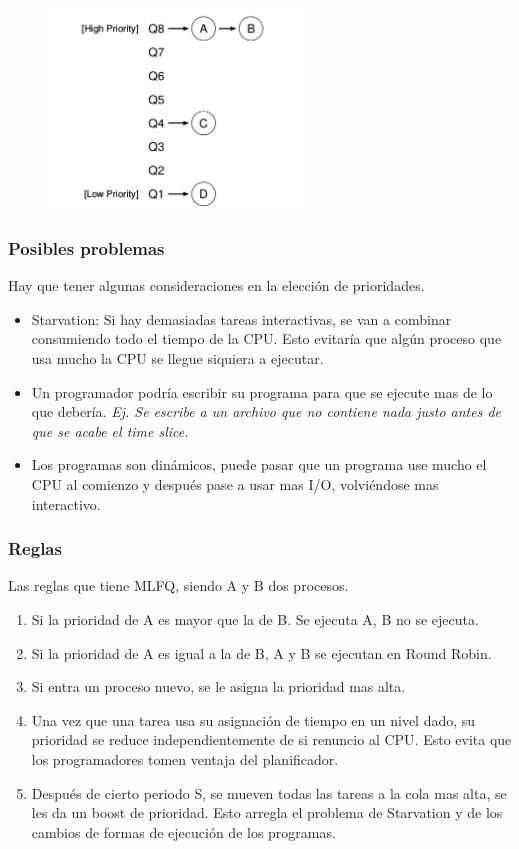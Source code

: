 \documentclass[titlepage,a4paper]{article}
\begin{document}
\begin{figure}[!htb]
    \centering
    \includegraphics[width=0.6\textwidth]{ImagenesApunte/mlfq.jpg}
\end{figure}

\subsubsection*{Posibles problemas}
Hay que tener algunas consideraciones en la elección de prioridades.
\begin{itemize}
    \item Starvation: Si hay demasiadas tareas interactivas, se van a combinar consumiendo todo el tiempo de la CPU. Esto evitaría que algún proceso que usa mucho la CPU se llegue siquiera a ejecutar.
    \item Un programador podría escribir su programa para que se ejecute mas de lo que debería. \textit{Ej. Se escribe a un archivo que no contiene nada justo antes de que se acabe el time slice.}
    \item Los programas son dinámicos, puede pasar que un programa use mucho el CPU al comienzo y después pase a usar mas I/O, volviéndose mas interactivo.
\end{itemize}

\subsubsection*{Reglas}

Las reglas que tiene MLFQ, siendo A y B dos procesos.
\begin{enumerate}
    \item Si la prioridad de A es mayor que la de B. Se ejecuta A, B no se ejecuta.
    \item Si la prioridad de A es igual a la de B, A y B se ejecutan en Round Robin.
    \item Si entra un proceso nuevo, se le asigna la prioridad mas alta.
    \item Una vez que una tarea usa su asignación de tiempo en un nivel dado, su prioridad se reduce independientemente de si renuncio al CPU. Esto evita que los programadores tomen ventaja del planificador.
    \item Después de cierto periodo S, se mueven todas las tareas a la cola mas alta, se les da un boost de prioridad. Esto arregla el problema de Starvation y de los cambios de formas de ejecución de los programas.
\end{enumerate}
\end{document}
